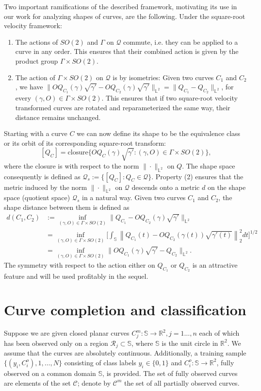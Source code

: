 \documentclass[11pt]{amsart}
\newcommand{\R}{\mathcal{R}}
\newcommand{\C}{C}
\newcommand{\Rtwo}{\mathbb{R}^2}
\newcommand{\ltwo}{\mathbb{L}^2}
\newcommand{\uc}{\mathbb{S}}
\theoremstyle{definition}
\begin{document}
Two important ramifications of the described framework, motivating its use in our work for analyzing shapes of curves, are the following. Under the square-root velocity framework:
\begin{enumerate}[1.]
\item The actions of $SO(2)$ and $\Gamma$ on $\mathcal{Q}$ commute, i.e. they can be applied to a curve in any order. This ensures that their combined action is given by the product group $\Gamma \times SO(2)$.
\item The action of $\Gamma \times SO(2)$ on $\mathcal{Q}$ is by isometries: Given two curves $\C_1$ and $\C_2$, we have $\|OQ_{\C_1}(\gamma)\sqrt{\gamma '}-OQ_{\C_2}(\gamma)\sqrt{\gamma '}\|_{\ltwo}=\|Q_{C_1}-Q_{C_2}\|_{\ltwo}$, for every $(\gamma,O) \in \Gamma \times SO(2)$. This ensures that if two square-root velocity transformed curves are rotated and reparameterized the same way, their distance remains unchanged. 
\end{enumerate}
 Starting with a curve $\C$ we can now define its shape to be the equivalence class or its orbit of its corresponding square-root transform:
 $$[Q_\C]=\text{closure}\{OQ_\C(\gamma) \sqrt{\gamma'}: (\gamma,O) \in \Gamma \times SO(2)\},$$
 where the closure is with respect to the norm $\|\cdot\|_{\ltwo}$ on $Q$. The shape space consequently is defined as $\mathcal{Q}_s:=\{[Q_\C]: Q_\C \in \mathcal{Q}\}$. Property (2) ensures that the metric induced by the norm $\|\cdot\|_{\ltwo}$ on $\mathcal{Q}$ descends onto a metric $d$ on the shape space (quotient space) $\mathcal{Q}_s$ in a natural way. Given two curves $\C_1$ and $\C_2$, the shape distance between them is defined as
 \begin{align}
 \label{distance}
 d(\C_1,\C_2)&:=\inf_{(\gamma,O) \in \Gamma \times SO(2)} \|Q_{\C_1} - OQ_{\C_2}(\gamma)\sqrt{\gamma'}\|_{\ltwo}\\
 &=\inf_{(\gamma,O) \in \Gamma \times SO(2)}\Big[\int_{\uc}\left\|Q_{C_1}(t)-OQ_{C_2}(\gamma(t))\sqrt{\gamma'(t)}\right\|_2^2dt\Big]^{1/2} \nonumber\\
 &=\inf_{(\gamma,O) \in \Gamma \times SO(2)} \|OQ_{C_1}(\gamma)\sqrt{\gamma'} - Q_{C_2}\|_{\ltwo}\nonumber.
  \end{align}
  The symmetry with respect to the action either on $Q_{C_1}$ or $Q_{C_2}$ is an attractive feature and will be used profitably in the sequel. 
\section{Curve completion and classification}
Suppose we are given closed planar curves $\C^m_j:\uc \to \mathbb{R}^2,j=1\ldots,n$ each of which has been observed only on a region $\R_j \subset \uc$, where $\uc$ is the unit circle in $\Rtwo$. We assume that the curves are absolutely continuous. Additionally, a training sample $\{(y_i,\C^o_i),1,\ldots,N\}$ consisting of class labels $y_i \in \{0,1\}$ and $C^o_i:\uc\to \mathbb{R}^2$, fully observed on a common domain $\uc$, is provided. The set of fully observed curves are elements of the set $\mathcal{C}$; denote by $\mathcal{C}^m$ the set of all partially observed curves. 
\end{document}
